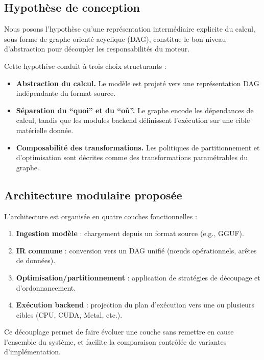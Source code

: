 \documentclass[11pt,a4paper]{article}
\begin{document}
\subsection{Hypoth\`ese de conception}

Nous posons l'hypoth\`ese qu'une repr\'esentation interm\'ediaire explicite du calcul, sous forme de graphe orient\'e acyclique (DAG), constitue le bon niveau d'abstraction pour d\'ecoupler les responsabilit\'es du moteur.

Cette hypoth\`ese conduit \`a trois choix structurants :

\begin{itemize}[leftmargin=*]
	\item \textbf{Abstraction du calcul.} Le mod\`ele est projet\'e vers une repr\'esentation DAG ind\'ependante du format source.
	\item \textbf{S\'eparation du ``quoi'' et du ``o\`u''.} Le graphe encode les d\'ependances de calcul, tandis que les modules backend d\'efinissent l'ex\'ecution sur une cible mat\'erielle donn\'ee.
	\item \textbf{Composabilit\'e des transformations.} Les politiques de partitionnement et d'optimisation sont d\'ecrites comme des transformations param\'etrables du graphe.
\end{itemize}

\subsection{Architecture modulaire propos\'ee}

L'architecture est organis\'ee en quatre couches fonctionnelles :

\begin{enumerate}[leftmargin=*]
	\item \textbf{Ingestion mod\`ele} : chargement depuis un format source (e.g., GGUF).
	\item \textbf{IR commune} : conversion vers un DAG unifi\'e (n\oe uds op\'erationnels, ar\^etes de donn\'ees).
	\item \textbf{Optimisation/partitionnement} : application de strat\'egies de d\'ecoupage et d'ordonnancement.
	\item \textbf{Ex\'ecution backend} : projection du plan d'ex\'ecution vers une ou plusieurs cibles (CPU, CUDA, Metal, etc.).
\end{enumerate}

Ce d\'ecouplage permet de faire \'evoluer une couche sans remettre en cause l'ensemble du syst\`eme, et facilite la comparaison contr\^ol\'ee de variantes d'impl\'ementation.
\end{document}

